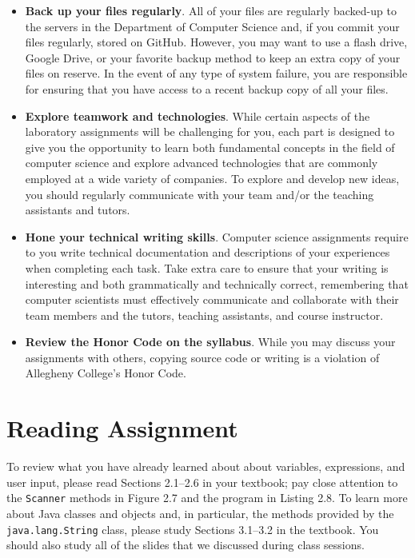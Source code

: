 \documentclass[11pt]{article}
\begin{document}
\begin{itemize}
\item {\bf Back up your files regularly}. All of your files are regularly
  backed-up to the servers in the Department of Computer Science and, if you
  commit your files regularly, stored on GitHub. However, you may want to use a
  flash drive, Google Drive, or your favorite backup method to keep an extra
  copy of your files on reserve. In the event of any type of system failure, you
  are responsible for ensuring that you have access to a recent backup copy of
  all your files.

\item {\bf Explore teamwork and technologies}. While certain aspects of the
  laboratory assignments will be challenging for you, each part is designed to
  give you the opportunity to learn both fundamental concepts in the field of
  computer science and explore advanced technologies that are commonly employed
  at a wide variety of companies. To explore and develop new ideas, you should
  regularly communicate with your team and/or the teaching assistants and
  tutors.

\item {\bf Hone your technical writing skills}. Computer science assignments
  require to you write technical documentation and descriptions of your
  experiences when completing each task. Take extra care to ensure that your
  writing is interesting and both grammatically and technically correct,
  remembering that computer scientists must effectively communicate and
  collaborate with their team members and the tutors, teaching assistants, and
  course instructor.

\item {\bf Review the Honor Code on the syllabus}. While you may discuss your
  assignments with others, copying source code or writing is a violation of
  Allegheny College's Honor Code.

\end{itemize}

\section*{Reading Assignment}

To review what you have already learned about about variables, expressions, and
user input, please read Sections 2.1--2.6 in your textbook; pay close attention
to the {\tt Scanner} methods in Figure 2.7 and the program in Listing 2.8. To
learn more about Java classes and objects and, in particular, the methods
provided by the {\tt java.lang.String} class, please study Sections 3.1--3.2 in
the textbook. You should also study all of the slides that we discussed during
class sessions.
\end{document}

